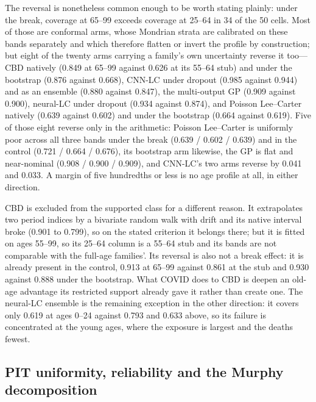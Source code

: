 The reversal is nonetheless common enough to be worth stating plainly:
under the break, coverage at 65--99 exceeds coverage at 25--64 in 34 of the
50 cells. Most of those are conformal arms, whose Mondrian strata are
calibrated on these bands separately and which therefore flatten or invert
the profile by construction; but eight of the twenty arms carrying a
family's own uncertainty reverse it too---CBD natively (0.849 at 65--99
against 0.626 at its 55--64 stub) and under the bootstrap (0.876 against
0.668), CNN-LC under dropout (0.985 against 0.944) and as an ensemble
(0.880 against 0.847), the multi-output GP (0.909 against 0.900),
neural-LC under dropout (0.934 against 0.874), and Poisson Lee--Carter
natively (0.639 against 0.602) and under the bootstrap (0.664 against
0.619). Five of those eight reverse only in the arithmetic: Poisson
Lee--Carter is uniformly poor across all three bands under the break
(0.639 / 0.602 / 0.639) and in the control (0.721 / 0.664 / 0.676), its
bootstrap arm likewise, the GP is flat and near-nominal (0.908 / 0.900 /
0.909), and CNN-LC's two arms reverse by 0.041 and 0.033. A margin of five
hundredths or less is no age profile at all, in either direction.

CBD is excluded from the supported class for a different reason. It
extrapolates two period indices by a bivariate random walk with drift and
its native interval broke (0.901 to 0.799), so on the stated criterion it
belongs there; but it is fitted on ages 55--99, so its 25--64 column is a
55--64 stub and its bands are not comparable with the full-age families'.
Its reversal is also not a break effect: it is already present in the
control, 0.913 at 65--99 against 0.861 at the stub and 0.930 against 0.888
under the bootstrap. What COVID does to CBD is deepen an old-age advantage
its restricted support already gave it rather than create one. The
neural-LC ensemble is the remaining exception in the other direction: it
covers only 0.619 at ages 0--24 against 0.793 and 0.633 above, so its
failure is concentrated at the young ages, where the exposure is largest
and the deaths fewest.

\subsection{PIT uniformity, reliability and the Murphy decomposition}


